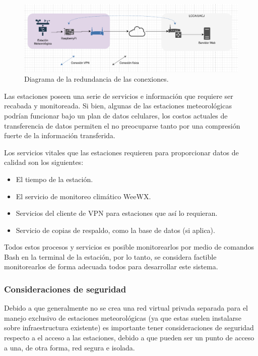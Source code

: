\begin{figure}[!ht]
	\centering
	\includegraphics[width=.75\linewidth]{images/diagrams/conexion.png}
	\caption{Diagrama de la redundancia de las conexiones.}
	\label{fig:conexion_redundancia}
\end{figure}

Las estaciones poseen una serie de servicios e información que requiere ser recabada y monitoreada. Si bien, algunas de las estaciones meteorológicas podrían funcionar bajo un plan de datos celulares, los costos actuales de transferencia de datos permiten el no preocuparse tanto por una compresión fuerte de la información transferida.

Los servicios vitales que las estaciones requieren para proporcionar datos de calidad son los siguientes:

\begin{itemize}
   \item El tiempo de la estación.
   \item El servicio de monitoreo climático WeeWX.
   \item Servicios del cliente de VPN para estaciones que así lo requieran.
   \item Servicio de copias de respaldo, como la base de datos (si aplica).
\end{itemize}


Todos estos procesos y servicios es posible monitorearlos por medio de comandos Bash en la terminal de la estación, por lo tanto, se considera factible monitorearlos de forma adecuada todos para desarrollar este sistema.

\subsubsection{Consideraciones de seguridad}

Debido a que generalmente no se crea una red virtual privada separada para el manejo exclusivo de estaciones meteorológicas (ya que estas suelen instalarse sobre infraestructura existente) es importante tener consideraciones de seguridad respecto a el acceso a las estaciones, debido a que pueden ser un punto de acceso a una, de otra forma, red segura e isolada.


